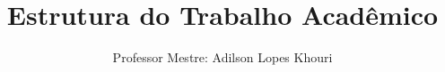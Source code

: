 \documentclass[compress, hyperref={pdfpagelayout=SinglePage}]{beamer}
\title[TCC II - Aula 01]{Estrutura do Trabalho Acadêmico}
\author{Professor Mestre: Adilson Lopes Khouri}
\begin{document}
	\begin{frame}
		\titlepage
	\end{frame}
	
	
	
	
	
	
	
	
	
	
		
	

	
	
	
	
		
	
		
		
		
				
	

	
\end{document}
